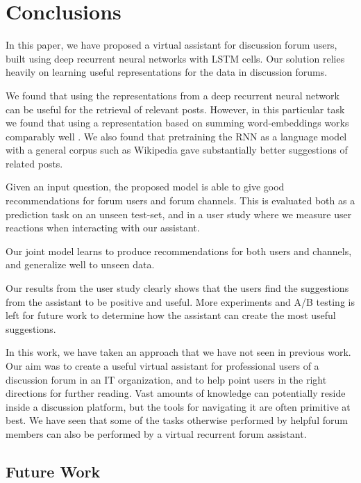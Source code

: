 \documentclass[11pt]{article}
\newenvironment{improve}{\par\color{orange}}{\par}
\newenvironment{improve}{\par\color{black}}{\par}
\begin{document}
\vfill

\section{Conclusions}

In this paper, we have proposed a virtual assistant for discussion forum users, built using deep recurrent neural networks with LSTM cells. Our solution relies heavily on learning useful representations for the data in discussion forums.

\begin{improve}
We found that using the representations from a deep recurrent neural network can be useful for the retrieval of relevant posts.
However, in this particular task we found that using a representation based on summing word-embeddings works comparably well%
.
We also found that pretraining the RNN as a language model with a general corpus such as Wikipedia gave substantially better suggestions of related posts.
\end{improve}

Given an input question, the proposed model is able to give good recommendations for forum users and forum channels. This is evaluated both as a prediction task on an unseen test-set, and in a user study where we measure user reactions when interacting with our assistant.

Our joint model learns to produce recommendations for both users and channels, and generalize well to unseen data.

Our results from the user study clearly shows that the users find the suggestions from the assistant to be positive and useful. More experiments and A/B testing is left for future work to determine how the assistant can create the most useful suggestions.

In this work, we have taken an approach that we have not seen in previous work. Our aim was to create a useful virtual assistant for professional users of a discussion forum in an IT organization, and to help point users in the right directions for further reading. Vast amounts of knowledge can potentially reside inside a discussion platform, but the tools for navigating it are often primitive at best. We have seen that some of the tasks otherwise performed by helpful forum members can also be performed by a virtual recurrent forum assistant.


\subsection{Future Work}
\end{document}
